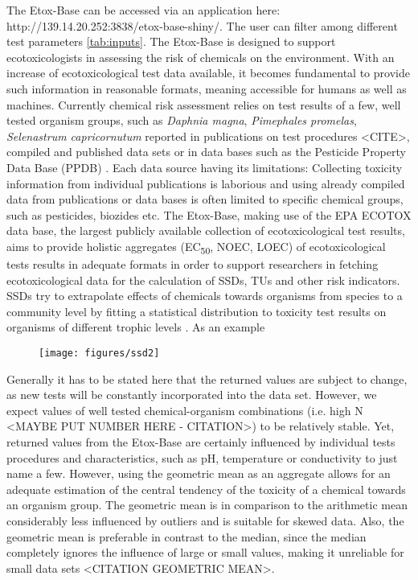 \documentclass[english]{article}
\newcommand{\etoxbase}{Etox-Base}
\newcommand{\epa}{EPA ECOTOX data base}
\newcommand{\app}{http://139.14.20.252:3838/etox-base-shiny/}
\newcommand{\ecfifty}{EC\textsubscript{50}}
\begin{document}
The \etoxbase{} can be accessed via an application here: \app{}. The user can filter among different test parameters \ref{tab:inputs}. The \etoxbase{} is designed to support ecotoxicologists in assessing the risk of chemicals on the environment. With an increase of ecotoxicological test data available, it becomes fundamental to provide such information in reasonable formats, meaning accessible for humans as well as machines. Currently chemical risk assessment relies on test results of a few, well tested organism groups, such as \textit{Daphnia magna}, \textit{Pimephales promelas}, \textit{Selenastrum capricornutum} reported in publications on test procedures <CITE>, compiled and published data sets \citep{malaj_organic_2014} or in data bases such as the Pesticide Property Data Base (PPDB) \citep{lewis_international_2016}. Each data source having its limitations: Collecting toxicity information from individual publications is laborious and using already compiled data from publications or data bases is often limited to specific chemical groups, such as pesticides, biozides etc. The \etoxbase{}, making use of the \epa{}, the largest publicly available collection of ecotoxicological test results, aims to provide holistic aggregates (\ecfifty{}, NOEC, LOEC) of ecotoxicological tests results in adequate formats in order to support researchers in fetching ecotoxicological data for the calculation of SSDs, TUs and other risk indicators. SSDs try to extrapolate effects of chemicals towards organisms from species to a community level by fitting a statistical distribution to toxicity test results on organisms of different trophic levels \citep{posthuma_species_2002}. As an example 

\begin{figure}
    \dentering
    \texttt{[image: figures/ssd2]}

\end{figure}




Generally it has to be stated here that the returned values are subject to change, as new tests will be constantly incorporated into the data set. However, we expect values of well tested chemical-organism combinations (i.e. high N <MAYBE PUT NUMBER HERE - CITATION>) to be relatively stable. Yet, returned values from the \etoxbase{} are certainly influenced by individual tests procedures and characteristics, such as pH, temperature or conductivity to just name a few. However, using the geometric mean as an aggregate allows for an adequate estimation of the central tendency of the toxicity of a chemical towards an organism group. The geometric mean is in comparison to the arithmetic mean considerably less influenced by outliers and is suitable for skewed data. Also, the geometric mean is preferable in contrast to the median, since the median completely ignores the influence of large or small values, making it unreliable for small data sets <CITATION GEOMETRIC MEAN>.
\end{document}
